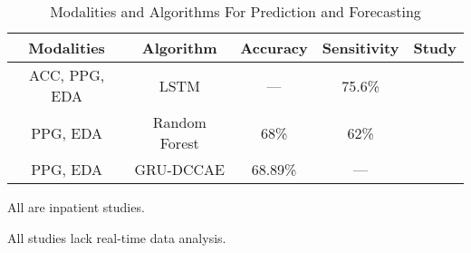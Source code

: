\begin{table}
    \caption{Modalities and Algorithms For Prediction and Forecasting}
    \label{tab:prediction_modalities_and_algos}
    \footnotesize
\begin{tabularx}{\textwidth}{@{}CCCCC@{}}
\toprule
Modalities & Algorithm & Accuracy & Sensitivity & Study \\ \midrule
ACC, PPG, EDA & LSTM & --- & 75.6\% & \cite{Meisel2020-ii} \\
PPG, EDA & Random Forest & 68\% & 62\% & \cite{Vieluf2023-zv} \\
PPG, EDA & GRU-DCCAE & 68.89\% & --- & \cite{Vieluf2023-ta} \\ \bottomrule
\end{tabularx}

\vspace{0.5em}

All are inpatient studies.

All studies lack real-time data analysis.

\end{table}